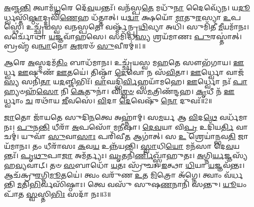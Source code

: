 \setcounter{anuvakam}{0}

\-\ul{𑌅}\-𑌞𑍍𑌜\-\ul{𑌨𑍍𑌤𑌿} 𑌤𑍍𑌵𑌾𑌮᳴\-\ul{𑌧𑍍𑌵}\-𑌰𑍇 𑌦𑍇᳴\-\ul{𑌵}\-𑌯𑌨𑍍𑌤𑌃᳴।
𑌵𑌨᳴𑌸𑍍𑌪\-\ul{𑌤𑍇} 𑌮𑌧𑍁᳴\-\ul{𑌨𑌾} 𑌦𑍈𑌵𑍍𑌯𑍇᳴𑌨।
𑌯\-\ul{𑌦𑍂}\-𑌰𑍍𑌧𑍍𑌵𑌸𑍍𑌤𑌿᳴\-\ul{𑌷𑍍𑌠𑌾}\-𑌦𑍍𑌦𑍍𑌰𑌵𑌿᳴\-\ul{𑌣𑍇}\-𑌹 𑌧᳴𑌤𑍍𑌤𑌾𑌤𑍍।
𑌯\-\ul{𑌦𑍍𑌵𑌾} 𑌕𑍍𑌷𑌯𑍋᳴ \ul{𑌮𑌾}\-𑌤𑍁\-\ul{𑌰}\-𑌸𑍍𑌯𑌾 \ul{𑌉}\-𑌪𑌸𑍍𑌥𑍇॑।
𑌉𑌚𑍍𑌛𑍍𑌰᳴𑌯𑌸𑍍𑌵 𑌵𑌨𑌸𑍍𑌪𑌤𑍇।
𑌵𑌰𑍍𑌷𑍍𑌮᳴𑌨𑍍𑌪𑍃\-\ul{𑌥𑌿}\-𑌵𑍍𑌯𑌾 𑌅𑌧𑌿᳴।
𑌸𑍁𑌮𑌿᳴𑌤𑍀 \ul{𑌮𑍀}\-𑌯𑌮𑌾᳴𑌨𑌃।
𑌵𑌰𑍍𑌚𑍋᳴𑌧𑌾 \ul{𑌯}\-𑌜𑍍𑌞𑌵𑌾᳴𑌹𑌸𑍇।
𑌸𑌮𑌿᳴𑌦𑍍𑌧\-\ul{𑌸𑍍𑌯} 𑌶𑍍𑌰𑌯᳴𑌮𑌾𑌣𑌃 \ul{𑌪𑍁}\-𑌰𑌸𑍍𑌤𑌾॑𑌤𑍍।
𑌬𑍍𑌰𑌹𑍍𑌮᳴ 𑌵\-\ul{𑌨𑍍𑌵𑌾}\-𑌨𑍋 \ul{𑌅}\-𑌜𑌰𑍞᳴ \ul{𑌸𑍁}\-𑌵𑍀𑌰𑌮𑍍॑॥1॥

\-\ul{𑌆}\-𑌰𑍇 \ul{𑌅}\-𑌸𑍍𑌮𑌦𑌮᳴\-\ul{𑌤𑌿𑌂} 𑌬𑌾𑌧᳴𑌮𑌾𑌨𑌃।
𑌉𑌚𑍍𑌛𑍍𑌰᳴𑌯𑌸𑍍𑌵 𑌮\-\ul{𑌹}\-𑌤𑍇 𑌸𑍗𑌭᳴𑌗𑌾𑌯।
\-\ul{𑌊}\-𑌰𑍍𑌧𑍍𑌵 \ul{𑌊}\-𑌷𑍁𑌣᳴ \ul{𑌊}\-𑌤𑌯𑍇॑।
𑌤𑌿𑌷𑍍𑌠𑌾᳴ \ul{𑌦𑍇}\-𑌵𑍋 𑌨 𑌸᳴\-\ul{𑌵𑌿}\-𑌤𑌾।
\-\ul{𑌊}\-𑌰𑍍𑌧𑍍𑌵𑍋 𑌵𑌾𑌜᳴\-\ul{𑌸𑍍𑌯} 𑌸𑌨𑌿᳴\-\ul{𑌤𑌾} 𑌯\-\ul{𑌦}\-𑌞𑍍𑌜𑌿𑌭𑌿𑌃᳴।
\-\ul{𑌵𑌾}\-𑌘𑌦𑍍𑌭𑌿᳴\-\ul{𑌰𑍍𑌵𑌿}\-𑌹𑍍𑌵𑌯𑌾᳴𑌮𑌹𑍇।
\-\ul{𑌊}\-𑌰𑍍𑌧𑍍𑌵𑍋 𑌨𑌃᳴ \ul{𑌪𑌾}\-𑌹𑍍𑌯𑍞𑌹᳴\-\ul{𑌸𑍋} 𑌨𑌿 \ul{𑌕𑍇}\-𑌤𑍁𑌨𑌾॑।
𑌵𑌿\-\ul{𑌶𑍍𑌵}\-\-\ul{𑍞} 𑌸\-\ul{𑌮}\-𑌤𑍍𑌰𑌿𑌣᳴𑌨𑍍𑌦𑌹।
\-\ul{𑌕𑍃}\-𑌧𑍀 𑌨᳴ \ul{𑌊}\-𑌰𑍍𑌧𑍍𑌵𑌾𑌂 \ul{𑌚} 𑌰𑌥𑌾᳴𑌯 \ul{𑌜𑍀}\-𑌵𑌸𑍇॑।
\-\ul{𑌵𑌿}\-𑌦𑌾 \ul{𑌦𑍇}\-𑌵𑍇𑌷𑍁᳴ \ul{𑌨𑍋} 𑌦𑍁𑌵𑌃᳴॥2॥

\-\ul{𑌜𑌾}\-𑌤𑍋 𑌜𑌾᳴𑌯𑌤𑍇 𑌸𑍁𑌦𑌿\-\ul{𑌨}\-𑌤𑍍𑌵𑍇 𑌅𑌹𑍍𑌨𑌾॑𑌮𑍍।
𑌸\-\ul{𑌮}\-𑌰𑍍𑌯 𑌆 \ul{𑌵𑌿}\-𑌦\-\ul{𑌥𑍇} 𑌵𑌰𑍍𑌧᳴𑌮𑌾𑌨𑌃।
\-\ul{𑌪𑍁}\-𑌨\-\ul{𑌨𑍍𑌤𑌿} 𑌧𑍀𑌰𑌾᳴ \ul{𑌅}\-𑌪𑌸𑍋᳴ 𑌮\-\ul{𑌨𑍀}\-𑌷𑌾।
\-\ul{𑌦𑍇}\-\-\ul{𑌵}\-𑌯𑌾 𑌵𑌿\-\ul{𑌪𑍍𑌰} 𑌉𑌦𑌿᳴𑌯\-\ul{𑌰𑍍𑌤𑌿} 𑌵𑌾𑌚𑌮𑍍॑।
𑌯𑍁𑌵𑌾᳴ \ul{𑌸𑍁}\-𑌵𑌾\-\ul{𑌸𑌾𑌃} 𑌪𑌰𑌿᳴𑌵𑍀\-\ul{𑌤} 𑌆𑌗𑌾॑𑌤𑍍।
𑌸 \ul{𑌉} 𑌶𑍍𑌰𑍇𑌯𑌾॑𑌨𑍍𑌭𑌵\-\ul{𑌤𑌿} 𑌜𑌾𑌯᳴𑌮𑌾𑌨𑌃।
𑌤𑌂 𑌧𑍀𑌰𑌾᳴𑌸𑌃 \ul{𑌕}\-𑌵\-\ul{𑌯} 𑌉𑌨𑍍𑌨᳴𑌯𑌨𑍍𑌤𑌿।
\-\ul{𑌸𑍍𑌵𑌾}\-𑌧𑌿\-\ul{𑌯𑍋} 𑌮𑌨᳴𑌸𑌾 𑌦𑍇\-\ul{𑌵}\-𑌯𑌨𑍍𑌤𑌃᳴।
\-\ul{𑌪𑍃}\-\-\ul{𑌥𑍁}\-𑌪𑌾\-\ul{𑌜𑌾} 𑌅𑌮᳴𑌰𑍍𑌤𑍍𑌯𑌃।
\-\ul{𑌘𑍃}\-𑌤𑌨𑌿᳴\-\ul{𑌰𑍍𑌣𑌿}\-𑌖𑍍𑌸𑍍𑌵𑌾᳴𑌹𑍁𑌤𑌃।
\-\ul{𑌅}\-𑌗𑍍𑌨𑌿\-\ul{𑌰𑍍𑌯}\-𑌜𑍍𑌞𑌸𑍍𑌯᳴ 𑌹\-\ul{𑌵𑍍𑌯}\-𑌵𑌾𑌟𑍍।
𑌤𑍞 \ul{𑌸}\-𑌬𑌾𑌧𑍋᳴ \ul{𑌯}\-𑌤𑌃 𑌸𑍍𑌰𑍁᳴𑌚𑌃।
\-\ul{𑌇}\-𑌤𑍍𑌥𑌾 \ul{𑌧𑌿}\-𑌯𑌾 \ul{𑌯}\-𑌜𑍍𑌞𑌵᳴𑌨𑍍𑌤𑌃।
𑌆𑌚᳴𑌕𑍍𑌰𑍁\-\ul{𑌰}\-𑌗𑍍𑌨𑌿\-\ul{𑌮𑍂}\-𑌤𑌯𑍇॑।
𑌤𑍍𑌵𑌂 𑌵𑌰𑍁᳴𑌣 \ul{𑌉}\-𑌤 \ul{𑌮𑌿}\-𑌤𑍍𑌰𑍋 𑌅᳴𑌗𑍍𑌨𑍇।
𑌤𑍍𑌵𑌾𑌂 𑌵᳴𑌰𑍍𑌧𑌨𑍍𑌤𑌿 \ul{𑌮}\-𑌤𑌿\-\ul{𑌭𑌿}\-𑌰𑍍𑌵𑌸𑌿᳴𑌷𑍍𑌠𑌾𑌃।
𑌤𑍍𑌵𑍇 𑌵𑌸𑍁᳴ 𑌸𑍁𑌷\-\ul{𑌣}\-𑌨𑌾𑌨𑌿᳴ 𑌸𑌨𑍍𑌤𑍁।
\-\ul{𑌯𑍂}\-𑌯𑌂 𑌪𑌾᳴𑌤 \ul{𑌸𑍍𑌵}\-𑌸𑍍𑌤𑌿\-\ul{𑌭𑌿𑌃} 𑌸𑌦𑌾᳴ 𑌨𑌃॥3॥\anuvakamend[\-\ul{𑌸𑍁}\-𑌵𑍀\-\ul{𑌰𑌂} 𑌦𑍁\-\ul{𑌵𑌃} 𑌸𑍍𑌵𑌾᳴𑌹𑍁\-\ul{𑌤𑍋}\-\-𑌽𑌷𑍍𑌟𑍗 𑌚᳴]

